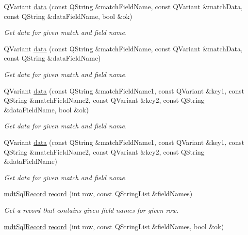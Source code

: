 \begin{DoxyCompactItemize}
Q\-Variant \hyperlink{classmdt_abstract_sql_table_controller_a40af55ec0b11a0a81f748662c912b761}{data} (const Q\-String \&match\-Field\-Name, const Q\-Variant \&match\-Data, const Q\-String \&data\-Field\-Name, bool \&ok)
\begin{DoxyCompactList}\small\item\em Get data for given match and field name. \end{DoxyCompactList}\item 
Q\-Variant \hyperlink{classmdt_abstract_sql_table_controller_a497441f3486c77cc832181fe34bd6492}{data} (const Q\-String \&match\-Field\-Name, const Q\-Variant \&match\-Data, const Q\-String \&data\-Field\-Name)
\begin{DoxyCompactList}\small\item\em Get data for given match and field name. \end{DoxyCompactList}\item 
Q\-Variant \hyperlink{classmdt_abstract_sql_table_controller_aa79313d4ac1fbdd86b90ad9d1c0121f9}{data} (const Q\-String \&match\-Field\-Name1, const Q\-Variant \&key1, const Q\-String \&match\-Field\-Name2, const Q\-Variant \&key2, const Q\-String \&data\-Field\-Name, bool \&ok)
\begin{DoxyCompactList}\small\item\em Get data for given match and field name. \end{DoxyCompactList}\item 
Q\-Variant \hyperlink{classmdt_abstract_sql_table_controller_a3b6e51c1d21ac2d0c045c5e798370046}{data} (const Q\-String \&match\-Field\-Name1, const Q\-Variant \&key1, const Q\-String \&match\-Field\-Name2, const Q\-Variant \&key2, const Q\-String \&data\-Field\-Name)
\begin{DoxyCompactList}\small\item\em Get data for given match and field name. \end{DoxyCompactList}\item 
\hyperlink{classmdt_sql_record}{mdt\-Sql\-Record} \hyperlink{classmdt_abstract_sql_table_controller_a1bf49f87908a1468bea5b9f3fc833a7c}{record} (int row, const Q\-String\-List \&field\-Names)
\begin{DoxyCompactList}\small\item\em Get a record that contains given field names for given row. \end{DoxyCompactList}\item 
\hyperlink{classmdt_sql_record}{mdt\-Sql\-Record} \hyperlink{classmdt_abstract_sql_table_controller_ae1f088f168d52b6253628a9a337a3adf}{record} (int row, const Q\-String\-List \&field\-Names, bool \&ok)

\end{DoxyCompactItemize}
